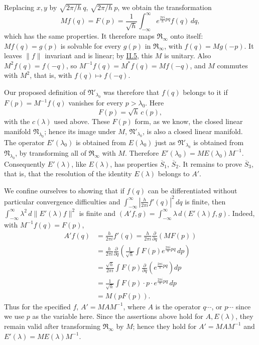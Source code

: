 \documentclass[fontsize=13pt,twoside,openany,headings=normal,parskip=false,bookmarkpackage=false,DIV=calc]{scrbook}
\begin{document}
\hypertarget{origpage-70}{}%
Replacing $x,y$ by $\sqrt{2\pi/h}\,q$, $\sqrt{2\pi/h}\,p$, we obtain the transformation
\[
Mf(q)=F(p)=\frac1{\sqrt h}\int_{-\infty}^{\infty}e^{\frac{2\pi i}{h}pq}f(q)\,dq,
\]
which has the same properties. It therefore maps $\mathfrak{R}_\infty$ onto itself: $Mf(q)=g(p)$ is solvable for every $g(p)$ in $\mathfrak{R}_\infty$, with $f(q)=Mg(-p)$. It leaves $\|f\|$ invariant and is linear; by \hyperref[sec:II.5]{II.5}, this $M$ is unitary. Also $M^2f(q)=f(-q)$, so $M^{-1}f(q)=M^*f(q)=Mf(-q)$, and $M$ commutes with $M^2$, that is, with $f(q)\mapsto f(-q)$.

Our proposed definition of $\mathfrak{N}'_{\lambda_0}$ was therefore that $f(q)$ belongs to it if $F(p)=M^{-1}f(q)$ vanishes for every $p>\lambda_0$. Here
\[
F(p)=\sqrt h\,c(p),
\]
with the $c(\lambda)$ used above. These $F(p)$ form, as we know, the closed linear manifold $\mathfrak{N}_{\lambda_0}$; hence its image under $M$, $\mathfrak{N}'_{\lambda_0}$, is also a closed linear manifold. The operator $E'(\lambda_0)$ is obtained from $E(\lambda_0)$ just as $\mathfrak{N}'_{\lambda_0}$ is obtained from $\mathfrak{N}_{\lambda_0}$, by transforming all of $\mathfrak{R}_\infty$ with $M$. Therefore $E'(\lambda_0)=ME(\lambda_0)M^{-1}$. Consequently $E'(\lambda)$, like $E(\lambda)$, has properties $\hyperref[cond:II.Sbar1]{\overline{S}_1}$, $\hyperref[cond:II.Sbar2]{\overline{S}_2}$. It remains to prove $\hyperref[cond:II.Sbar3]{\overline{S}_3}$, that is, that the resolution of the identity $E(\lambda)$ belongs to $A'$.

We confine ourselves to showing that if $f(q)$ can be differentiated without particular convergence difficulties and $\int_{-\infty}^{\infty}|\frac{h}{2\pi i}f'(q)|^2\,dq$ is finite, then $\int_{-\infty}^{\infty}\lambda^2\,d\|E'(\lambda)f\|^2$ is finite and $(A'f,g)=\int_{-\infty}^{\infty}\lambda\,d(E'(\lambda)f,g)$. Indeed, with $M^{-1}f(q)=F(p)$,
\begin{align*}
A'f(q)&=\frac{h}{2\pi i}f'(q)
=\frac{h}{2\pi i}\frac{\partial}{\partial q}(MF(p))\\
&=\frac{h}{2\pi i}\frac{\partial}{\partial q}\left(\frac1{\sqrt h}\int F(p)e^{\frac{2\pi i}{h}pq}\,dp\right)\\
&=\frac{\sqrt h}{2\pi i}\int F(p)\frac{\partial}{\partial q}\left(e^{\frac{2\pi i}{h}pq}\right)dp\\
&=\frac1{\sqrt h}\int F(p)\cdot p\cdot e^{\frac{2\pi i}{h}pq}\,dp\\
&=M(pF(p)).
\end{align*}
Thus for the specified $f$, $A'=MAM^{-1}$, where $A$ is the operator $q\cdots$, or $p\cdots$ since we use $p$ as the variable here. Since the assertions above hold for $A,E(\lambda)$, they remain valid after transforming $\mathfrak{R}_\infty$ by $M$; hence they hold for $A'=MAM^{-1}$ and $E'(\lambda)=ME(\lambda)M^{-1}$.
\end{document}
